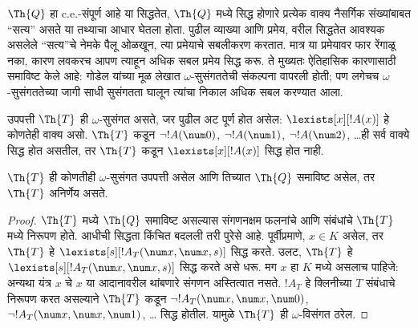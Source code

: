 \documentclass[../../../include/open-logic-section]{subfiles}
\begin{document}


\begin{explain}
$\Th{Q}$ हा c.e.-संपूर्ण आहे या सिद्धतेत,
$\Th{Q}$ मध्ये सिद्ध होणारे प्रत्येक वाक्य नैसर्गिक संख्यांबाबत
``सत्य'' असते या तथ्याचा आधार घेतला होता. पुढील व्याख्या आणि
प्रमेय, वरील सिद्धतेत आवश्यक असलेले ``सत्य''चे नेमके पैलू
ओळखून, त्या प्रमेयाचे सबलीकरण करतात. मात्र या प्रमेयावर फार
रेंगाळू नका, कारण लवकरच आपण त्याहून अधिक सबल प्रमेय सिद्ध करू.
ते मुख्यतः ऐतिहासिक कारणासाठी समाविष्ट केले आहे: गोडेल यांच्या
मूळ लेखात $\omega$-सुसंगततेची संकल्पना वापरली होती; पण लगेचच
$\omega$-सुसंगततेच्या जागी साधी सुसंगतता घालून त्यांचा निकाल
अधिक सबल करण्यात आला.
\end{explain}

\begin{defn}
उपपत्ती $\Th{T}$ ही $\omega$-सुसंगत असते, जर पुढील अट पूर्ण होत असेल:
$\lexists[x][!A(x)]$ हे कोणतेही वाक्य असो. $\Th{T}$ कडून
$\lnot !A(\num 0)$, $\lnot !A(\num 1)$,
$\lnot !A(\num 2)$, \dots ही सर्व वाक्ये सिद्ध होत असतील,
तर $\Th{T}$ कडून $\lexists[x][!A(x)]$ सिद्ध होत नाही.
\end{defn}

\begin{thm}
  $\Th{T}$ ही कोणतीही $\omega$-सुसंगत उपपत्ती असेल आणि तिच्यात
  $\Th{Q}$ समाविष्ट असेल, तर $\Th{T}$ अनिर्णेय असते.
\end{thm}

\begin{proof}
$\Th{T}$ मध्ये $\Th{Q}$ समाविष्ट असल्यास संगणनक्षम
फलनांचे आणि संबंधांचे $\Th{T}$ मध्ये निरूपण होते.
आधीची सिद्धता किंचित बदलली तरी पुरेसे आहे. पूर्वीप्रमाणे,
$x \in K$ असेल, तर $\Th{T}$ हे $\lexists[s][!A_T(\num
  x,\num x, s)]$ सिद्ध करते. उलट, $\Th{T}$ हे
$\lexists[s][!A_T(\num x, \num x, s)]$ सिद्ध करते असे धरू.
मग $x$ हा $K$ मध्ये असलाच पाहिजे: अन्यथा यंत्र $x$ चे
$x$ या आदानावरील थांबणारे संगणन अस्तित्वात नसते. $!A_T$ हे
क्लिनीच्या $T$ संबंधाचे निरूपण करत असल्याने $\Th{T}$ कडून
$\lnot !A_T(\num x, \num x, \num 0)$,
$\lnot !A_T(\num x, \num x, \num 1)$, \dots
सिद्ध होतील. यामुळे $\Th{T}$ ही $\omega$-विसंगत ठरेल.
\end{proof}
\end{document}
